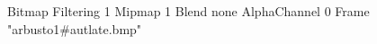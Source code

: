 {Bitmap
	{Filtering 1}
	{Mipmap 1}
	{Blend none}
	{AlphaChannel 0}
	{Frame "arbusto1#autlate.bmp"}
}
